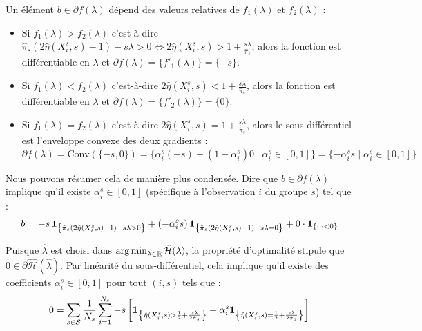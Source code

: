 Un élément $b \in \partial f(\lambda)$ dépend des valeurs relatives de $f_1(\lambda)$ et $f_2(\lambda)$ :
\begin{itemize}
    \item Si $f_1(\lambda) > f_2(\lambda)$ c'est-à-dire $\hat{\pi}_s (2\hat{\eta}(X_i^s, s) - 1) - s\lambda > 0 \iff 2\hat{\eta}(X_i^s, s) > 1 + \frac{s\lambda}{\hat{\pi}_s}$, alors la fonction est différentiable en $\lambda$ et $\partial f(\lambda) = \{f'_1(\lambda)\} = \{-s\}$.
    \item Si $f_1(\lambda) < f_2(\lambda)$ c'est-à-dire $2\hat{\eta}(X_i^s, s) < 1 + \frac{s\lambda}{\hat{\pi}_s}$, alors la fonction est différentiable en $\lambda$ et $\partial f(\lambda) = \{f'_2(\lambda)\} = \{0\}$.
    \item Si $f_1(\lambda) = f_2(\lambda)$ c'est-à-dire $2\hat{\eta}(X_i^s, s) = 1 + \frac{s\lambda}{\hat{\pi}_s}$, alors le sous-différentiel est l'enveloppe convexe des deux gradients :
    \begin{equation*}
        \partial f(\lambda) = \text{Conv}(\{-s, 0\}) = \{ \alpha_i^s (-s) + (1 - \alpha_i^s) 0 \mid \alpha_i^s \in [0, 1] \} = \{ -\alpha_i^s s \mid \alpha_i^s \in [0, 1] \}
    \end{equation*}
\end{itemize}

Nous pouvons résumer cela de manière plus condensée. Dire que $b \in \partial f(\lambda)$ implique qu'il existe $\alpha_i^s \in [0, 1]$ (spécifique à l'observation $i$ du groupe $s$) tel que :
\begin{equation}
    b = -s \, \mathbf{1}_{\left\{ \hat{\pi}_s (2\hat{\eta}(X_i^s, s) - 1) - s\lambda > 0 \right\}} + (-\alpha_i^s s) \, \mathbf{1}_{\left\{ \hat{\pi}_s (2\hat{\eta}(X_i^s, s) - 1) - s\lambda = 0 \right\}} + 0 \cdot \mathbf{1}_{\{ \dots < 0 \}}
\end{equation}

Puisque $\hat{\lambda}$ est choisi dans $\operatorname*{arg\,min}_{\lambda \in \mathbb{R}} \hat{\mathcal{H}}(\lambda)$, la propriété d'optimalité stipule que $0 \in \partial \hat{\mathcal{H}}(\hat{\lambda})$.
Par linéarité du sous-différentiel, cela implique qu'il existe des coefficients $\alpha_i^s \in [0, 1]$ pour tout $(i,s)$ tels que :
\begin{equation}
    0 = \sum_{s \in \mathcal{S}} \frac{1}{N_s} \sum_{i=1}^{N_s} -s \left[ \mathbf{1}_{\left\{ \hat{\eta}(X_i^s, s) > \frac{1}{2} + \frac{s\hat{\lambda}}{2\hat{\pi}_s} \right\}} + \alpha_i^s \mathbf{1}_{\left\{ \hat{\eta}(X_i^s, s) = \frac{1}{2} + \frac{s\hat{\lambda}}{2\hat{\pi}_s} \right\}} \right]
\end{equation}

